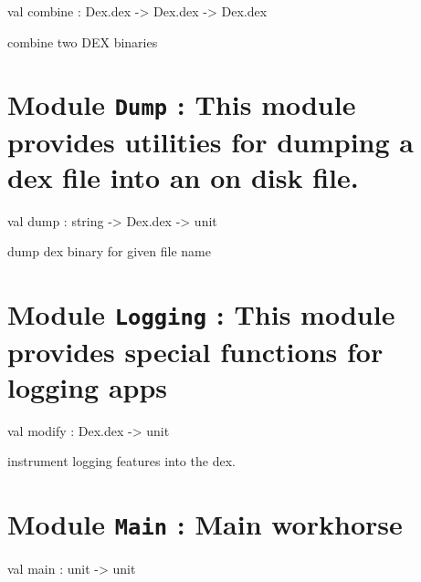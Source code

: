 \documentclass[11pt]{article}
\begin{document}
\label{val:Combine.combine}\begin{ocamldoccode}
val combine : Dex.dex -> Dex.dex -> Dex.dex
\end{ocamldoccode}
\begin{ocamldocdescription}
combine two DEX binaries


\end{ocamldocdescription}


\section{Module {\tt{Dump}} : This module provides utilities for dumping a dex file into an on
    disk file.}
\label{module:Dump}




\ocamldocvspace{0.5cm}



\label{val:Dump.dump}\begin{ocamldoccode}
val dump : string -> Dex.dex -> unit
\end{ocamldoccode}
\begin{ocamldocdescription}
dump dex binary for given file name


\end{ocamldocdescription}


\section{Module {\tt{Logging}} : This module provides special functions for logging apps}
\label{module:Logging}




\ocamldocvspace{0.5cm}



\label{val:Logging.modify}\begin{ocamldoccode}
val modify : Dex.dex -> unit
\end{ocamldoccode}
\begin{ocamldocdescription}
instrument logging features into the dex.


\end{ocamldocdescription}


\section{Module {\tt{Main}} : Main workhorse}
\label{module:Main}




\ocamldocvspace{0.5cm}



\label{val:Main.main}\begin{ocamldoccode}
val main : unit -> unit
\end{ocamldoccode}
\end{document}

